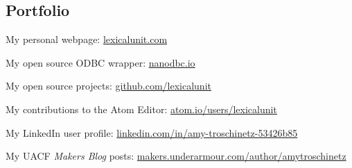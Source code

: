 \documentclass[12pt, tweaklist, line]{res}
\let\tempone\itemize
\let\temptwo\enditemize
\renewenvironment{itemize}{\tempone\vspace{-.15in}\setlength{\topsep}{0pt}\setlength{\itemsep}{3pt}\vspace{-.15in}}{\temptwo}
\begin{document}
\begin{resume}
\section{Portfolio}
\begin{itemize}
\vspace{.55in} %
\item My personal webpage: \href{http://lexicalunit.com}{lexicalunit.com}
\item My open source ODBC wrapper: \href{http://nanodbc.io}{nanodbc.io}
\item My open source projects: \href{https://github.com/lexicalunit}{github.com/lexicalunit}
\item My contributions to the Atom Editor: \href{https://atom.io/users/lexicalunit}{atom.io/users/lexicalunit}
\item My LinkedIn user profile: \href{https://www.linkedin.com/in/amy-troschinetz-53426b85/}{linkedin.com/in/amy-troschinetz-53426b85}
\item My UACF \textit{Makers Blog} posts: \href{https://makers.underarmour.com/author/amytroschinetz/}{makers.underarmour.com/author/amytroschinetz}
\end{itemize}

\end{resume}
\end{document}

